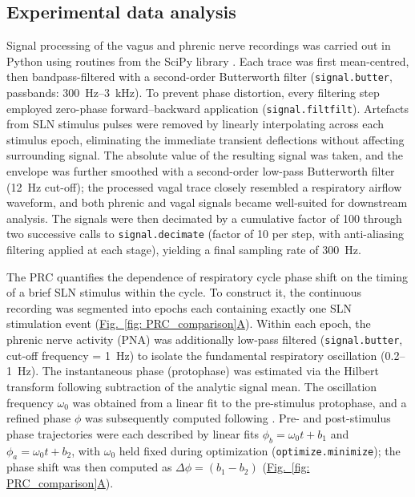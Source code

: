 \documentclass[pdflatex,sn-mathphys-ay]{sn-jnl}%
\renewcommand{\figureautorefname}{Fig.}
\newcommand{\Figref}[2][]{\hyperref[#2]{\figureautorefname~\ref*{#2}#1}}
\theoremstyle{thmstyleone}%
\theoremstyle{thmstyletwo}%
\theoremstyle{thmstylethree}%
\begin{document}
\subsection{Experimental data analysis}
Signal processing of the vagus and phrenic nerve recordings was carried out in Python using routines from the SciPy library \citep{2020SciPy-NMeth}. Each trace was first mean-centred, then bandpass-filtered with a second-order Butterworth filter (\texttt{signal.butter}, passbands: 300~Hz--3~kHz). To prevent phase distortion, every filtering step employed zero-phase forward--backward application (\texttt{signal.filtfilt}). Artefacts from SLN stimulus pulses were removed by linearly interpolating across each stimulus epoch, eliminating the immediate transient deflections without affecting surrounding signal. The absolute value of the resulting signal was taken, and the envelope was further smoothed with a second-order low-pass Butterworth filter (12~Hz cut-off); the processed vagal trace closely resembled a respiratory airflow waveform, and both phrenic and vagal signals became well-suited for downstream analysis. The signals were then decimated by a cumulative factor of 100 through two successive calls to \texttt{signal.decimate} (factor of 10 per step, with anti-aliasing filtering applied at each stage), yielding a final sampling rate of 300~Hz.

The PRC quantifies the dependence of respiratory cycle phase shift on the timing of a brief SLN stimulus within the cycle. To construct it, the continuous recording was segmented into epochs each containing exactly one SLN stimulation event (\Figref[A]{fig: PRC_comparison}). Within each epoch, the phrenic nerve activity (PNA) was additionally low-pass filtered (\texttt{signal.butter}, cut-off frequency = 1~Hz) to isolate the fundamental respiratory oscillation (0.2--1~Hz). The instantaneous phase (protophase) was estimated via the Hilbert transform \citep{kralemann2008phase} following subtraction of the analytic signal mean. The oscillation frequency $\omega_0$ was obtained from a linear fit to the pre-stimulus protophase, and a refined phase $\phi$ was subsequently computed following \citep{kralemann2008phase}.
Pre- and post-stimulus phase trajectories were each described by linear fits $\phi_b = \omega_0 t + b_1$ and $\phi_a = \omega_0 t + b_2$, with $\omega_0$ held fixed during optimization (\texttt{optimize.minimize}); the phase shift was then computed as $\Delta \phi = (b_1 - b_2)$ (\Figref[A]{fig: PRC_comparison}).
\end{document}
